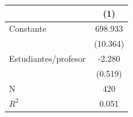 \begin{tabular}[t]{lc}
\toprule
  & (1)\\
\midrule
Constante & 698.933\\
 & (10.364)\\
Estudiantes/profesor & -2.280\\
 & (0.519)\\
\midrule
N & 420\\
$R^2$ & 0.051\\
\bottomrule
\end{tabular}
